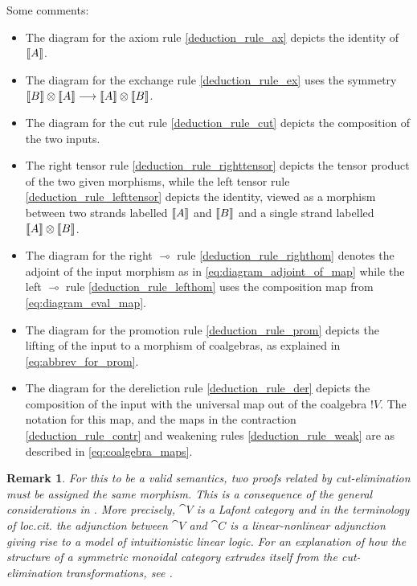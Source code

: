 \documentclass[english,letter paper,12pt,reqno]{article}
\theoremstyle{example}
\newtheorem{remark}[theorem]{Remark}
\numberwithin{equation}{section}
\begin{document}
Some comments:
\begin{itemize}
\item The diagram for the axiom rule \eqref{deduction_rule_ax} depicts the identity of $\llbracket A \rrbracket$.
\item The diagram for the exchange rule \eqref{deduction_rule_ex} uses the symmetry $\llbracket B \rrbracket \otimes \llbracket A \rrbracket \longrightarrow \llbracket A \rrbracket \otimes \llbracket B \rrbracket$.
\item The diagram for the cut rule \eqref{deduction_rule_cut} depicts the composition of the two inputs.
\item The right tensor rule \eqref{deduction_rule_righttensor} depicts the tensor product of the two given morphisms, while the left tensor rule \eqref{deduction_rule_lefttensor} depicts the identity, viewed as a morphism between two strands labelled $\llbracket A \rrbracket$ and $\llbracket B \rrbracket$ and a single strand labelled $\llbracket A \rrbracket \otimes \llbracket B \rrbracket$.
\item The diagram for the right $\multimap$ rule \eqref{deduction_rule_righthom} denotes the adjoint of the input morphism as in \eqref{eq:diagram_adjoint_of_map} while the left $\multimap$ rule \eqref{deduction_rule_lefthom} uses the composition map from \eqref{eq:diagram_eval_map}.
\item The diagram for the promotion rule \eqref{deduction_rule_prom} depicts the lifting of the input to a morphism of coalgebras, as explained in \eqref{eq:abbrev_for_prom}.
\item The diagram for the dereliction rule \eqref{deduction_rule_der} depicts the composition of the input with the universal map out of the coalgebra ${!} V$. The notation for this map, and the maps in the contraction \eqref{deduction_rule_contr} and weakening rules \eqref{deduction_rule_weak} are as described in \eqref{eq:coalgebra_maps}.
\end{itemize}

\begin{remark} For this to be a valid semantics, two proofs related by cut-elimination must be assigned the same morphism. This is a consequence of the general considerations in \cite[\S 7]{mellies}. More precisely, $\cat{V}$ is a Lafont category \cite[\S 7.2]{mellies} and in the terminology of \emph{loc.cit.} the adjunction between $\cat{V}$ and $\cat{C}$ is a linear-nonlinear adjunction giving rise to a model of intuitionistic linear logic. For an explanation of how the structure of a symmetric monoidal category extrudes itself from the cut-elimination transformations, see \cite[\S 2]{mellies}.
\end{remark}
\end{document}
